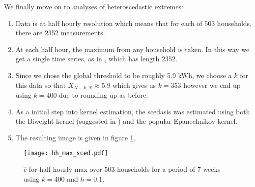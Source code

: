 \documentclass[a4paper]{article}
\begin{document}


We finally move on to analyses of heteroscedastic extremes:
\begin{enumerate}
\item Data is at half hourly resolution which means that for each of 503 households, there are 2352 measurements.
\item At each half hour, the maximum from any household is taken. In this way we get a single time series, as in \cite{einmahl16}, which has length 2352.
\item Since we chose the global threshold to be roughly 5.9 kWh, we choose a $k$ for this data so that $X_{N-k,N} \approx 5.9$ which gives us $k=353$ however we end up using $k=400$ due to rounding up as before. 
\item As a initial step into kernel estimation, the scedasis was estimated using both the Biweight kernel (suggested in \cite{einmahl16}) and the popular Epanechnikov kernel.
\item The resulting image is given in figure \ref{fig:mysced_hh_max}.
\end{enumerate}

\begin{figure}
\centering
\texttt{[image: hh\_max\_sced.pdf]}
\caption{\label{fig:mysced_hh_max} $\hat{c}$ for half hourly max over 503 households for a period of 7 weeks using $k=400$ and $h=0.1$.}
\end{figure}
\end{document}
